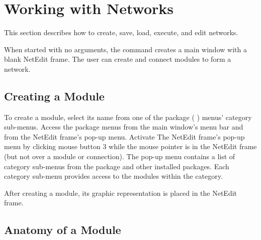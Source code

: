 %
%
%
%
%

%

\chapter{Working with Networks}
\label{ch:workwithnets}

This section describes how to create, save, load, execute, and edit
networks.

When started with no arguments, the  command creates a
main window with a blank NetEdit frame. The user can create and
connect modules to form a network.


\section{Creating a Module}
\label{sec:creatingmodules}

To create a module, select its name from one of the package (\eg{} \sr)
menus' category sub-menus. Access the package menus from the
main window's menu bar and from the NetEdit frame's pop-up menu. 
 Activate The NetEdit frame's pop-up menu by clicking mouse button
3 while the mouse pointer is in the NetEdit frame (but not over a
module or connection).  The pop-up menu contains a list of category
sub-menus from the \sr{} package and other installed packages. 
Each category sub-menu provides access to the modules within the
category.

After creating a module, its graphic representation is 
placed in the NetEdit frame.

\section{Anatomy of a Module}
\label{sec:modanatomy}

  \newcommand{\modgraphic}%
  {\centerline{\epsfig{file=Figures/modgraphic-1.eps.gz,width=4in,
        bbllx=0, bblly=0, bburx=325, bbury=157}}}
\begin{htmlonly}
  \newcommand{\modgraphic}{%
  \htmladdimg[align=top,width="256",alt="SCIRun Module Graphic"]
  {../Figures/modgraphic-1.gif}}
\end{htmlonly}

